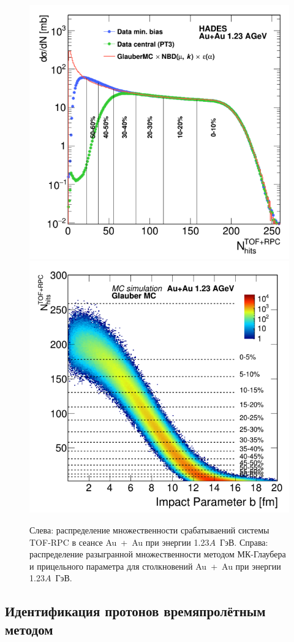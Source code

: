 \begin{figure}[ht]
\begin{center}
    \includegraphics[width=0.45\linewidth]{images/mc_glauber_auau_mult.png}
    \includegraphics[width=0.45\linewidth]{images/mc_glauber_auau_b_mult.png}
    \caption{Слева: распределение множественности срабатываений системы TOF-RPC в сеансе Au~+~Au при энергии 1.23$A$~ГэВ. Справа: распределение разыгранной множественности методом МК-Глаубера и прицельного параметра для столкновений Au~+~Au при энергии 1.23$A$~ГэВ.}
    \label{fig:mc_glauber_auau}
\end{center}
\end{figure}

\subsection{Идентификация протонов времяпролётным методом}

